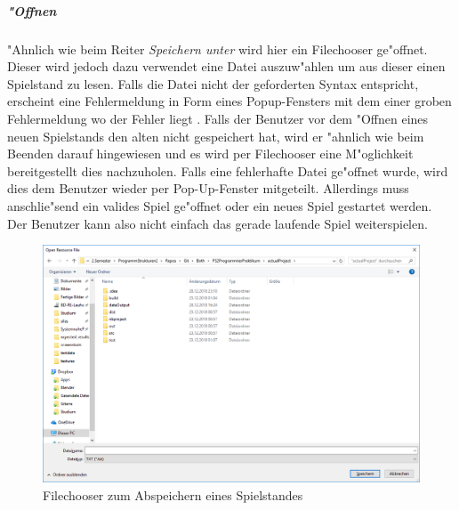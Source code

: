 \subparagraph{"Offnen}
"Ahnlich wie beim Reiter \emph{Speichern unter} wird hier ein Filechooser ge"offnet. Dieser wird jedoch dazu verwendet eine Datei auszuw"ahlen um aus dieser einen Spielstand zu lesen. Falls die Datei nicht der geforderten Syntax entspricht, erscheint eine Fehlermeldung in Form eines Popup-Fensters mit dem einer groben Fehlermeldung wo der Fehler liegt . Falls der Benutzer vor dem "Offnen eines neuen Spielstands den alten nicht gespeichert hat, wird er "ahnlich wie beim Beenden darauf hingewiesen und es wird per Filechooser eine M"oglichkeit bereitgestellt dies nachzuholen. Falls eine fehlerhafte Datei ge"offnet wurde, wird dies dem Benutzer wieder per Pop-Up-Fenster mitgeteilt. Allerdings muss anschlie"send ein valides Spiel ge"offnet oder ein neues Spiel gestartet werden. Der Benutzer kann also nicht einfach das gerade laufende Spiel weiterspielen. 

\begin{figure}
	\centering
	\includegraphics{screenshots/screenshot_Filechooser}
	\caption[Filechooser]{Filechooser zum Abspeichern eines Spielstandes}
	\label{fig:filechooser}
\end{figure}

